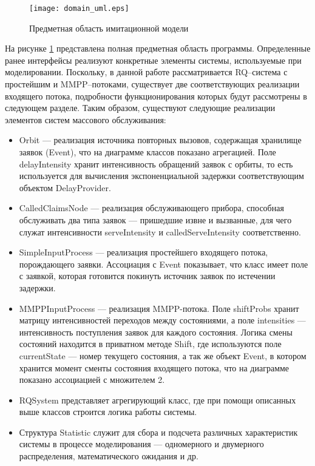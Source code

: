 \begin{figure}[H]
	\centering
	\texttt{[image: domain\_uml.eps]}
	\caption{Предметная область имитационной модели}
	\label{domain_uml}
\end{figure}
На рисунке \ref{domain_uml} представлена полная предметная область программы. Определенные ранее интерфейсы реализуют конкретные элементы системы, используемые при моделировании. Поскольку, в данной работе рассматривается RQ--система с простейшим и MMPP--потоками, существует две соответствующих реализации входящего потока, подробности функционирования которых будут рассмотрены в следующем разделе. Таким образом, существуют следующие реализации элементов систем массового обслуживания:
\begin{itemize}
	\item Orbit --- реализация источника повторных вызовов, содержащая хранилище заявок (Event), что на диаграмме классов показано агрегацией. Поле delayIntensity хранит интенсивность обращений заявок с орбиты, то есть используется для вычисления экспоненциальной задержки соответствующим объектом DelayProvider.
	\item CalledClaimsNode --- реализация обслуживающего прибора, способная обслуживать два типа заявок --- пришедшие извне и вызванные, для чего служат интенсивности serveIntensity и calledServeIntensity соответственно.
	\item SimpleInputProcess --- реализация простейшего входящего потока, порождающего заявки. Ассоциация с Event показывает, что класс имеет поле с заявкой, которая готовится покинуть источник заявок по истечении задержки.
	\item MMPPInputProcess --- реализация MMPP-потока. Поле shiftProbs хранит матрицу интенсивностей переходов между состояниями, а поле intensities --- интенсивность поступления заявок для каждого состояния. Логика смены состояний находится в приватном методе Shift, где используются поле currentState --- номер текущего состояния, а так же объект Event, в котором хранится момент сменты состояния входящего потока, что на диаграмме показано ассоциацией с множителем 2.
	\item RQSystem представляет агрегирующий класс, где при помощи описанных выше классов строится логика работы системы.
	\item Структура Statistic служит для сбора и подсчета различных характеристик системы в процессе моделирования --- одномерного и двумерного распределения, математического ожидания и др. 
\end{itemize}
\clearpage

